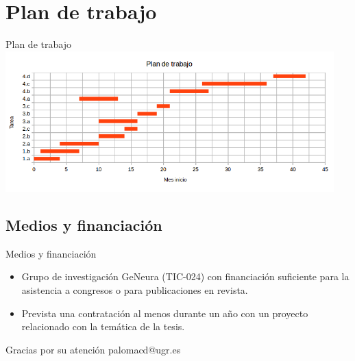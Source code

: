 \documentclass{beamer}
\begin{document}
\section{Plan de trabajo}

\begin{frame}{Plan de trabajo}
\includegraphics[width=0.95\textwidth]{./imgs/especiedegantt.png}
\end{frame}

\subsection{Medios y financiación}

\begin{frame}{Medios y financiación}

\begin{itemize}
  \item Grupo de investigación GeNeura (TIC-024) con financiación suficiente para la asistencia a congresos o para publicaciones en revista.
  \item Prevista una contratación al menos durante un año con un proyecto relacionado con la temática de la tesis.
\end{itemize}

\end{frame}

\begin{frame}
  Gracias por su atención
  palomacd@ugr.es
\end{frame}
\end{document}

